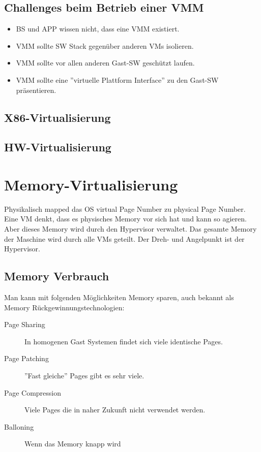 \subsection{Challenges beim Betrieb einer VMM}
\begin{itemize}
	\item BS und APP wissen nicht, dass eine VMM existiert.
	\item VMM sollte SW Stack gegenüber anderen VMs isolieren.
	\item VMM sollte vor allen anderen Gast-SW geschützt laufen.
	\item VMM sollte eine ''virtuelle Plattform Interface'' zu den Gast-SW präsentieren.
\end{itemize}


\subsection{X86-Virtualisierung}

\subsection{HW-Virtualisierung}

\section{Memory-Virtualisierung}
Physikalisch mapped das OS virtual Page Number zu physical Page Number. Eine VM denkt, dass es physisches Memory vor sich hat und kann so agieren. Aber dieses Memory wird durch den Hypervisor verwaltet. Das gesamte Memory der Maschine wird durch alle VMs geteilt. Der Dreh- und Angelpunkt ist der Hypervisor.

\subsection{Memory Verbrauch}
Man kann mit folgenden Möglichkeiten Memory sparen, auch bekannt als Memory Rückgewinnungstechnologien:
\begin{description}
	\item[Page Sharing] In homogenen Gast Systemen findet sich viele identische Pages.
	\item[Page Patching] ''Fast gleiche'' Pages gibt es sehr viele.
	\item[Page Compression] Viele Pages die in naher Zukunft nicht verwendet werden.
	\item[Balloning] Wenn das Memory knapp wird
\end{description}


